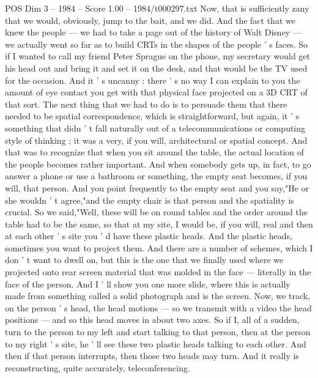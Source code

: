 \begin{textsample}{POS Dim 3 – 1984 – Score 1.00 – 1984/t000297.txt}
Now, that is sufficiently zany that we would, obviously, jump to the bait, and we did.
And the fact that we knew the people — we had to take a page out of the history of Walt Disney — we actually went so far as to build CRTs in the shapes of the people ' s faces.
So if I wanted to call my friend Peter Sprague on the phone, my secretary would get his head out and bring it and set it on the desk, and that would be the TV used for the occasion.
And it ' s uncanny : there ' s no way I can explain to you the amount of eye contact you get with that physical face projected on a 3D CRT of that sort.
The next thing that we had to do is to persuade them that there needed to be spatial correspondence, which is straightforward, but again, it ' s something that didn ' t fall naturally out of a telecommunications or computing style of thinking ; it was a very, if you will, architectural or spatial concept.
And that was to recognize that when you sit around the table, the actual location of the people becomes rather important.
And when somebody gets up, in fact, to go answer a phone or use a bathroom or something, the empty seat becomes, if you will, that person.
And you point frequently to the empty seat and you say,"He or she wouldn ' t agree,"and the empty chair is that person and the spatiality is crucial.
So we said,"Well, these will be on round tables and the order around the table had to be the same, so that at my site, I would be, if you will, real and then at each other ' s site you ' d have these plastic heads.
And the plastic heads, sometimes you want to project them.
And there are a number of schemes, which I don ' t want to dwell on, but this is the one that we finally used where we projected onto rear screen material that was molded in the face — literally in the face of the person.
And I ' ll show you one more slide, where this is actually made from something called a solid photograph and is the screen.
Now, we track, on the person ' s head, the head motions — so we transmit with a video the head positions — and so this head moves in about two axes.
So if I, all of a sudden, turn to the person to my left and start talking to that person, then at the person to my right ' s site, he ' ll see these two plastic heads talking to each other.
And then if that person interrupts, then those two heads may turn.
And it really is reconstructing, quite accurately, teleconferencing.

\end{textsample}
